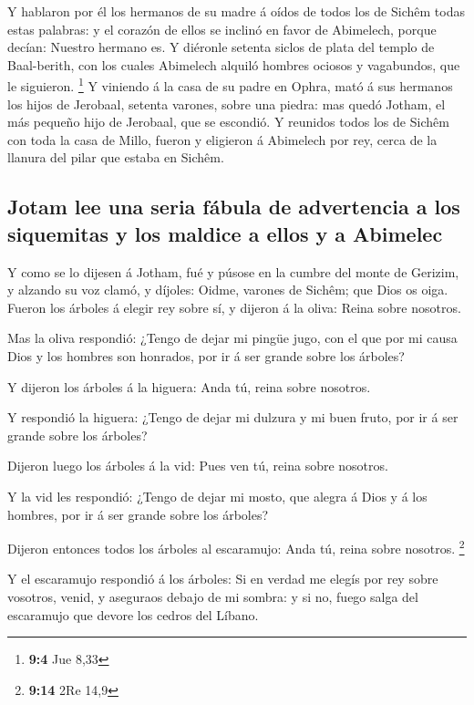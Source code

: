  Y hablaron por él los hermanos de su madre á oídos de todos
los de Sichêm todas estas palabras: y el corazón de ellos se inclinó en
favor de Abimelech, porque decían: Nuestro hermano es.  Y
diéronle setenta siclos de plata del templo de Baal-berith, con los
cuales Abimelech alquiló hombres ociosos y vagabundos, que le siguieron.
\footnote{\textbf{9:4} Jue 8,33}  Y viniendo á la casa de su
padre en Ophra, mató á sus hermanos los hijos de Jerobaal, setenta
varones, sobre una piedra: mas quedó Jotham, el más pequeño hijo de
Jerobaal, que se escondió.  Y reunidos todos los de Sichêm
con toda la casa de Millo, fueron y eligieron á Abimelech por rey, cerca
de la llanura del pilar que estaba en Sichêm.

\hypertarget{jotam-lee-una-seria-fuxe1bula-de-advertencia-a-los-siquemitas-y-los-maldice-a-ellos-y-a-abimelec}{%
\subsection{Jotam lee una seria fábula de advertencia a los siquemitas y
los maldice a ellos y a
Abimelec}\label{jotam-lee-una-seria-fuxe1bula-de-advertencia-a-los-siquemitas-y-los-maldice-a-ellos-y-a-abimelec}}

 Y como se lo dijesen á Jotham, fué y púsose en la cumbre
del monte de Gerizim, y alzando su voz clamó, y díjoles: Oidme, varones
de Sichêm; que Dios os oiga.  Fueron los árboles á elegir
rey sobre sí, y dijeron á la oliva: Reina sobre nosotros.

 Mas la oliva respondió: ¿Tengo de dejar mi pingüe jugo, con
el que por mi causa Dios y los hombres son honrados, por ir á ser grande
sobre los árboles?

 Y dijeron los árboles á la higuera: Anda tú, reina sobre
nosotros.

 Y respondió la higuera: ¿Tengo de dejar mi dulzura y mi
buen fruto, por ir á ser grande sobre los árboles?

 Dijeron luego los árboles á la vid: Pues ven tú, reina
sobre nosotros.

 Y la vid les respondió: ¿Tengo de dejar mi mosto, que
alegra á Dios y á los hombres, por ir á ser grande sobre los árboles?

 Dijeron entonces todos los árboles al escaramujo: Anda tú,
reina sobre nosotros. \footnote{\textbf{9:14} 2Re 14,9}

 Y el escaramujo respondió á los árboles: Si en verdad me
elegís por rey sobre vosotros, venid, y aseguraos debajo de mi sombra: y
si no, fuego salga del escaramujo que devore los cedros del Líbano.

